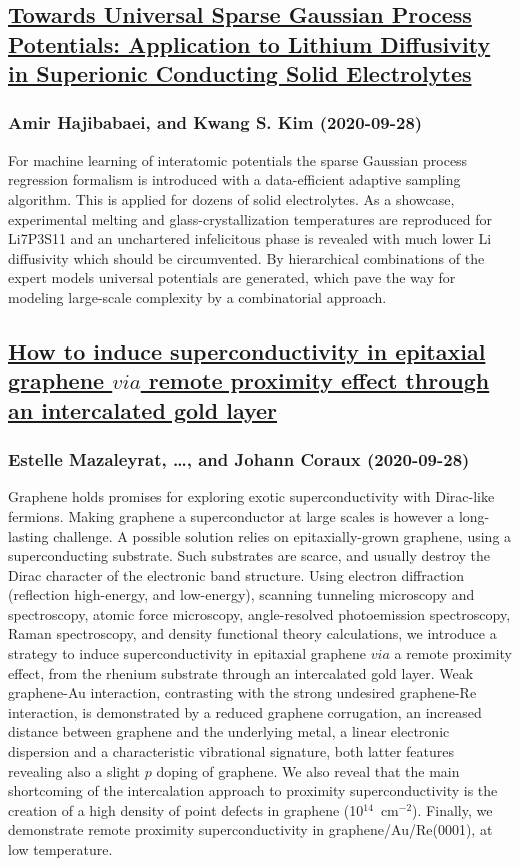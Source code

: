\subsection*{\href{http://arxiv.org/abs/2009.13179v1}{Towards Universal Sparse Gaussian Process Potentials: Application to  Lithium Diffusivity in Superionic Conducting Solid Electrolytes}}
\subsubsection*{Amir Hajibabaei, and Kwang S. Kim (2020-09-28)}
For machine learning of interatomic potentials the sparse Gaussian process
regression formalism is introduced with a data-efficient adaptive sampling
algorithm. This is applied for dozens of solid electrolytes. As a showcase,
experimental melting and glass-crystallization temperatures are reproduced for
Li7P3S11 and an unchartered infelicitous phase is revealed with much lower Li
diffusivity which should be circumvented. By hierarchical combinations of the
expert models universal potentials are generated, which pave the way for
modeling large-scale complexity by a combinatorial approach.

\subsection*{\href{http://arxiv.org/abs/2009.13176v1}{How to induce superconductivity in epitaxial graphene $via$ remote  proximity effect through an intercalated gold layer}}
\subsubsection*{Estelle Mazaleyrat, \dots, and Johann Coraux (2020-09-28)}
Graphene holds promises for exploring exotic superconductivity with
Dirac-like fermions. Making graphene a superconductor at large scales is
however a long-lasting challenge. A possible solution relies on
epitaxially-grown graphene, using a superconducting substrate. Such substrates
are scarce, and usually destroy the Dirac character of the electronic band
structure. Using electron diffraction (reflection high-energy, and low-energy),
scanning tunneling microscopy and spectroscopy, atomic force microscopy,
angle-resolved photoemission spectroscopy, Raman spectroscopy, and density
functional theory calculations, we introduce a strategy to induce
superconductivity in epitaxial graphene $via$ a remote proximity effect, from
the rhenium substrate through an intercalated gold layer. Weak graphene-Au
interaction, contrasting with the strong undesired graphene-Re interaction, is
demonstrated by a reduced graphene corrugation, an increased distance between
graphene and the underlying metal, a linear electronic dispersion and a
characteristic vibrational signature, both latter features revealing also a
slight $p$ doping of graphene. We also reveal that the main shortcoming of the
intercalation approach to proximity superconductivity is the creation of a high
density of point defects in graphene (10$^{14}$~cm$^{-2}$). Finally, we
demonstrate remote proximity superconductivity in graphene/Au/Re(0001), at low
temperature.

